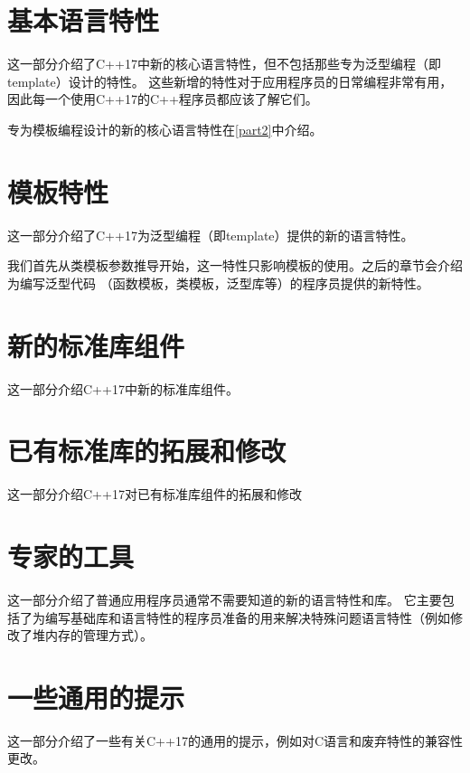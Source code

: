 \documentclass[twoside, 10pt, AutoFakeBold, AutoFakeSlant]{book}
\begin{document}
    \frontmatter
    \pagestyle{front}
    \tableofcontents

    \mainmatter
    \pagestyle{main}


    \part{基本语言特性}\label{part1}
    这一部分介绍了C++17中新的核心语言特性，但不包括那些专为泛型编程（即template）设计的特性。
    这些新增的特性对于应用程序员的日常编程非常有用，因此每一个使用C++17的C++程序员都应该了解它们。

    专为模板编程设计的新的核心语言特性在\autoref{part2}中介绍。

    
    
    
    
    
    
    
    


    \part{模板特性}\label{part2}
    这一部分介绍了C++17为泛型编程（即template）提供的新的语言特性。

    我们首先从类模板参数推导开始，这一特性只影响模板的使用。之后的章节会介绍为编写泛型代码
    （函数模板，类模板，泛型库等）的程序员提供的新特性。

    
    
    
    
    
    


    \part{新的标准库组件}\label{part3}
    这一部分介绍C++17中新的标准库组件。

    
    
    
    
    
    


    \part{已有标准库的拓展和修改}\label{part4}
    这一部分介绍C++17对已有标准库组件的拓展和修改

    
    
    
    
    
    
    
    


    \part{专家的工具}\label{part5}
    这一部分介绍了普通应用程序员通常不需要知道的新的语言特性和库。
    它主要包括了为编写基础库和语言特性的程序员准备的用来解决特殊问题语言特性（例如修改了堆内存的管理方式）。

    
    
    
    
    


    \part{一些通用的提示}\label{part6}
    这一部分介绍了一些有关C++17的通用的提示，例如对C语言和废弃特性的兼容性更改。
    
    

    \backmatter
\end{document}
